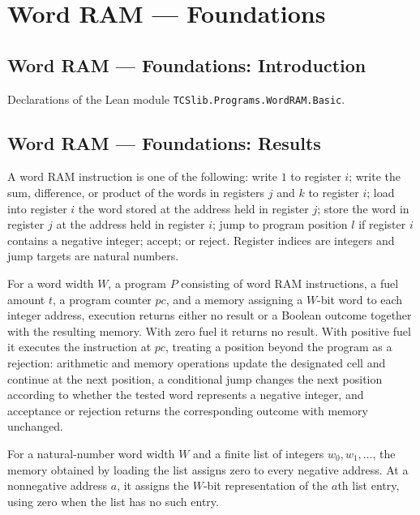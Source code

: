 \section{Word RAM --- Foundations}
\subsection*{Word RAM --- Foundations: Introduction}

Declarations of the Lean module \texttt{TCSlib.Programs.WordRAM.Basic}.

\subsection*{Word RAM --- Foundations: Results}

\begin{definition}
\label{WordRAM.Instr}
\leanok
A word RAM instruction is one of the following: write $1$ to register $i$; write the
sum, difference, or product of the words in registers $j$ and $k$ to register $i$; load
into register $i$ the word stored at the address held in register $j$; store the word in
register $j$ at the address held in register $i$; jump to program position $l$ if
register $i$ contains a negative integer; accept; or reject. Register indices are
integers and jump targets are natural numbers.
\end{definition}

\begin{definition}
\label{WordRAM.exec}
\leanok
{}
For a word width $W$, a program $P$ consisting of word RAM instructions, a fuel amount
$t$, a program counter $pc$, and a memory assigning a $W$-bit word to each integer
address, execution returns either no result or a Boolean outcome together with the
resulting memory. With zero fuel it returns no result. With positive fuel it executes
the instruction at $pc$, treating a position beyond the program as a rejection:
arithmetic and memory operations update the designated cell and continue at the next
position, a conditional jump changes the next position according to whether the tested
word represents a negative integer, and acceptance or rejection returns the
corresponding outcome with memory unchanged.
\end{definition}

\begin{definition}
\label{WordRAM.loadWords}
\leanok
For a natural-number word width $W$ and a finite list of integers $w_0,w_1,\ldots$, the
memory obtained by loading the list assigns zero to every negative address. At a
nonnegative address $a$, it assigns the $W$-bit representation of the $a$th list entry,
using zero when the list has no such entry.
\end{definition}
